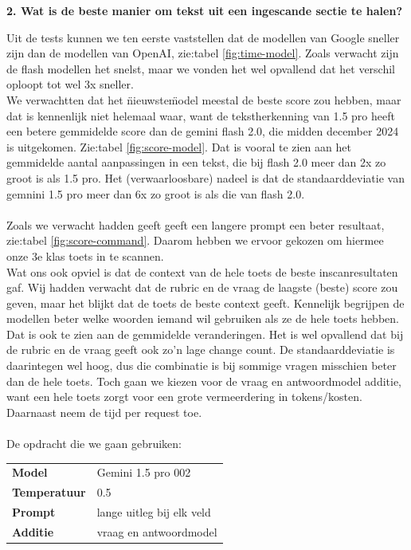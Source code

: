 \documentclass[12pt]{article}
\begin{document}
\noindent\textbf{2. Wat is de beste manier om tekst uit een ingescande sectie te halen?}
\begin{multicols}{2}
Uit de tests kunnen we ten eerste vaststellen dat de modellen van Google sneller zijn dan de modellen van OpenAI, zie:tabel \ref{fig:time-model}. Zoals verwacht zijn de flash modellen het snelst, maar we vonden het wel opvallend dat het verschil oploopt tot wel 3x sneller. \\
We verwachtten dat het \"nieuwste\" model meestal de beste score zou hebben, maar dat is kennenlijk niet helemaal waar, want de tekstherkenning van 1.5 pro heeft een betere gemmidelde score dan de gemini flash 2.0, die midden december 2024 is uitgekomen. Zie:tabel \ref{fig:score-model}. Dat is vooral te zien aan het gemmidelde aantal aanpassingen in een tekst, die bij flash 2.0 meer dan 2x zo groot is als 1.5 pro. Het (verwaarloosbare) nadeel is dat de standaarddeviatie van gemnini 1.5 pro meer dan 6x zo groot is als die van flash 2.0. \\
\\
Zoals we verwacht hadden geeft geeft een langere prompt een beter resultaat, zie:tabel \ref{fig:score-command}. Daarom hebben we ervoor gekozen om hiermee onze 3e klas toets in te scannen. 
\\
Wat ons ook opviel is dat de context van de hele toets de beste inscanresultaten gaf. Wij hadden verwacht dat de rubric en de vraag de laagste (beste) score zou geven, maar het blijkt dat de toets de beste context geeft. Kennelijk begrijpen de modellen beter welke woorden iemand wil gebruiken als ze de hele toets hebben. Dat is ook te zien aan de gemmidelde veranderingen. Het is wel opvallend dat bij de rubric en de vraag geeft ook zo'n lage change count. De standaarddeviatie is daarintegen wel hoog, dus die combinatie is bij sommige vragen misschien beter dan de hele toets. Toch gaan we kiezen voor de vraag en antwoordmodel additie, want een hele toets zorgt voor een grote vermeerdering in tokens/kosten. Daarnaast neem de tijd per request toe.\\
\\
\noindent De opdracht die we gaan gebruiken:\\
\begin{tabularx}{\textwidth}{ll}
    \textbf{Model} & Gemini 1.5 pro 002 \\
    \textbf{Temperatuur} & 0.5 \\
    \textbf{Prompt} & lange uitleg bij elk veld \\
    \textbf{Additie} & vraag en antwoordmodel \\
\end{tabularx}

\end{multicols}
\end{document}
